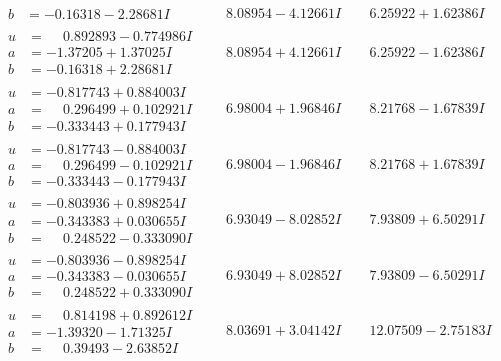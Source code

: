 \documentclass[1p]{elsarticle_modified}
\theoremstyle{definition}
\begin{document}
$$\begin{array}{c|c|c}
\begin{aligned}
b &= -0.16318 - 2.28681 I\end{aligned}
 & \phantom{-}8.08954 - 4.12661 I & \phantom{-}6.25922 + 1.62386 I \\ \hline\begin{aligned}
u &= \phantom{-}0.892893 - 0.774986 I \\
a &= -1.37205 + 1.37025 I \\
b &= -0.16318 + 2.28681 I\end{aligned}
 & \phantom{-}8.08954 + 4.12661 I & \phantom{-}6.25922 - 1.62386 I \\ \hline\begin{aligned}
u &= -0.817743 + 0.884003 I \\
a &= \phantom{-}0.296499 + 0.102921 I \\
b &= -0.333443 + 0.177943 I\end{aligned}
 & \phantom{-}6.98004 + 1.96846 I & \phantom{-}8.21768 - 1.67839 I \\ \hline\begin{aligned}
u &= -0.817743 - 0.884003 I \\
a &= \phantom{-}0.296499 - 0.102921 I \\
b &= -0.333443 - 0.177943 I\end{aligned}
 & \phantom{-}6.98004 - 1.96846 I & \phantom{-}8.21768 + 1.67839 I \\ \hline\begin{aligned}
u &= -0.803936 + 0.898254 I \\
a &= -0.343383 + 0.030655 I \\
b &= \phantom{-}0.248522 - 0.333090 I\end{aligned}
 & \phantom{-}6.93049 - 8.02852 I & \phantom{-}7.93809 + 6.50291 I \\ \hline\begin{aligned}
u &= -0.803936 - 0.898254 I \\
a &= -0.343383 - 0.030655 I \\
b &= \phantom{-}0.248522 + 0.333090 I\end{aligned}
 & \phantom{-}6.93049 + 8.02852 I & \phantom{-}7.93809 - 6.50291 I \\ \hline\begin{aligned}
u &= \phantom{-}0.814198 + 0.892612 I \\
a &= -1.39320 - 1.71325 I \\
b &= \phantom{-}0.39493 - 2.63852 I\end{aligned}
 & \phantom{-}8.03691 + 3.04142 I & \phantom{-}12.07509 - 2.75183 I \\ \hline\begin{aligned}

\end{aligned}
\end{array}$$
\end{document}
